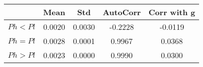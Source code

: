 \begin{tiny}\begin{tabular}{|l|c|c|c|c|}
\hline
&\textbf{Mean}&\textbf{Std}&\textbf{AutoCorr}&\textbf{Corr with g}\\\hline
\textbf{$Ph<Pl$}&0.0020&0.0030&-0.2228&-0.0119\\\hline
\textbf{$Ph=Pl$}&0.0028&0.0001&0.9967&0.0368\\\hline
\textbf{$Ph>Pl$}&0.0023&0.0000&0.9990&0.0300\\\hline
\end{tabular}
\end{tiny}